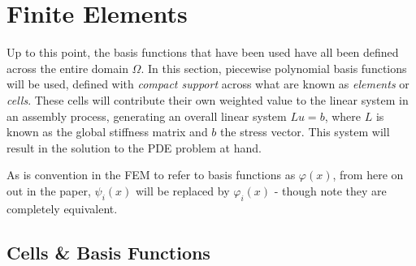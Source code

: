 \section{Finite Elements}\label{elems}

Up to this point, the basis functions that have been used have all been defined across the entire domain $\Omega$. In this section, piecewise polynomial basis functions will be used, defined with \textit{compact support} across what are known as \textit{elements} or \textit{cells}. These cells will contribute their own weighted value to the linear system in an assembly process, generating an overall linear system $Lu = b$, where $L$ is known as the global stiffness matrix and $b$ the stress vector. This system will result in the solution to the PDE problem at hand.

\begin{remark}
	As is convention in the FEM to refer to basis functions as $\varphi(x)$, from here on out in the paper, $\psi_i(x)$ will be replaced by $\varphi_i(x)$ - though note they are completely equivalent.
\end{remark}

\subsection{Cells \& Basis Functions}

